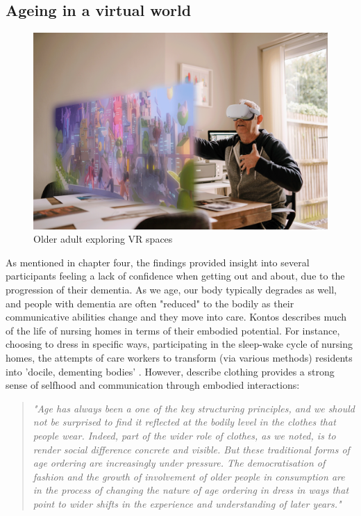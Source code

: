 \subsection{Ageing in a virtual world}
\label{FutureStudyOne}
\begin{figure}[htp]
\centering
\includegraphics[width=1\linewidth]{Images/Discussion/Aging_in_VR.png}
\caption{Older adult exploring VR spaces}
\label{fig:Aging_VR}
\end{figure}
As mentioned in chapter four, the findings provided insight into several participants feeling a lack of confidence when getting out and about, due to the progression of their dementia. As we age, our body typically degrades as well, and people with dementia are often "reduced" to the bodily as their communicative abilities change and they move into care. Kontos describes much of the life of nursing homes in terms of their embodied potential. For instance, choosing to dress in specific ways, participating in the sleep-wake cycle of nursing homes, the attempts of care workers to transform (via various methods) residents into 'docile, dementing bodies' \citep{kontos_embodiment_2013,kontos_relational_2017}. However, \cite{twigg2009clothing} describe clothing provides a strong sense of selfhood and communication through embodied interactions:

\begin{quote}
\textit{"Age has always been a one of the key structuring principles, and we should not be surprised to find it reflected at the bodily level in the clothes that people wear. Indeed, part of the wider role of clothes, as we noted, is to render social difference concrete and visible. But these traditional forms of age ordering are increasingly under pressure. The democratisation of fashion and the growth of involvement of older people in consumption are in the process of changing the nature of age ordering in dress in ways that point to wider shifts in the experience and understanding of later years." }\citep{twigg2009clothing}
\end{quote}

